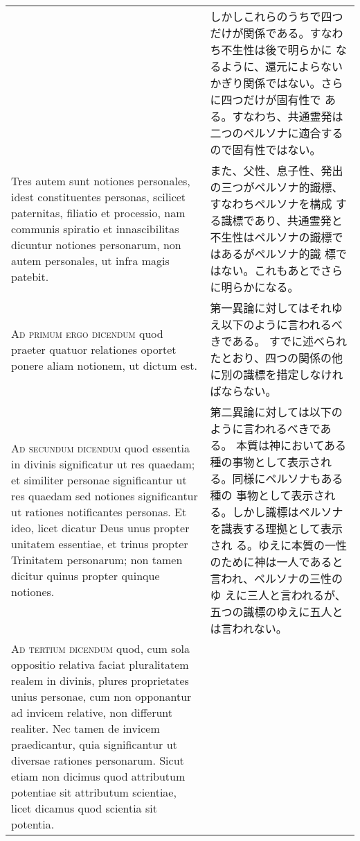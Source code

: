 \documentclass[10pt]{jsarticle} %
\begin{document}
\begin{longtable}{p{21em}p{21em}}
&

しかしこれらのうちで四つだけが関係である。すなわち不生性は後で明らかに
なるように、還元によらないかぎり関係ではない。さらに四つだけが固有性で
ある。すなわち、共通霊発は二つのペルソナに適合するので固有性ではない。

\\


Tres autem sunt notiones personales, idest
constituentes personas, scilicet paternitas, filiatio et processio,
nam communis spiratio et innascibilitas dicuntur notiones personarum,
non autem personales, ut infra magis patebit.

&

また、父性、息子性、発出の三つがペルソナ的識標、すなわちペルソナを構成
する識標であり、共通霊発と不生性はペルソナの識標ではあるがペルソナ的識
標ではない。これもあとでさらに明らかになる。



\\




{\scshape Ad primum ergo dicendum} quod praeter quatuor relationes oportet ponere
aliam notionem, ut dictum est.

&

第一異論に対してはそれゆえ以下のように言われるべきである。
すでに述べられたとおり、四つの関係の他に別の識標を措定しなければならない。

\\



{\scshape Ad secundum dicendum} quod essentia in divinis significatur ut res
quaedam; et similiter personae significantur ut res quaedam sed
notiones significantur ut rationes notificantes personas. Et ideo,
licet dicatur Deus unus propter unitatem essentiae, et trinus propter
Trinitatem personarum; non tamen dicitur quinus propter quinque
notiones.

&

第二異論に対しては以下のように言われるべきである。
本質は神においてある種の事物として表示される。同様にペルソナもある種の
事物として表示される。しかし識標はペルソナを識表する理拠として表示され
る。ゆえに本質の一性のために神は一人であると言われ、ペルソナの三性のゆ
えに三人と言われるが、五つの識標のゆえに五人とは言われない。

\\



{\scshape Ad tertium dicendum} quod, cum sola oppositio relativa faciat
pluralitatem realem in divinis, plures proprietates unius personae,
cum non opponantur ad invicem relative, non differunt realiter. Nec
tamen de invicem praedicantur, quia significantur ut diversae rationes
personarum. Sicut etiam non dicimus quod attributum potentiae sit
attributum scientiae, licet dicamus quod scientia sit potentia.


\end{longtable}
\end{document}
